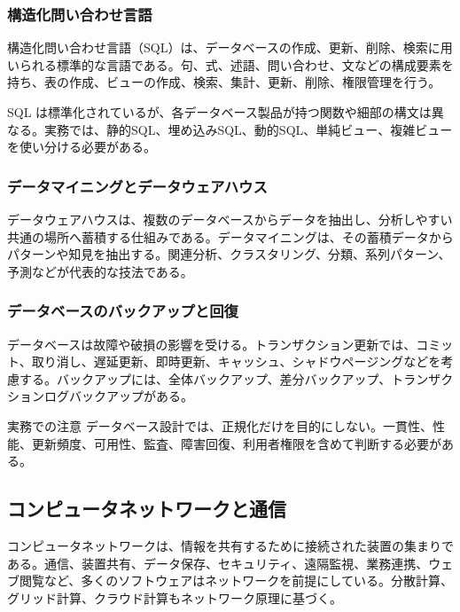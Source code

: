 \documentclass[a4paper,11pt]{ltjsarticle}
\numberwithin{figure}{section}
\numberwithin{table}{section}
\begin{document}
\subsubsection{構造化問い合わせ言語}

構造化問い合わせ言語（SQL）は、データベースの作成、更新、削除、検索に用いられる標準的な言語である。句、式、述語、問い合わせ、文などの構成要素を持ち、表の作成、ビューの作成、検索、集計、更新、削除、権限管理を行う。

SQL は標準化されているが、各データベース製品が持つ関数や細部の構文は異なる。実務では、静的SQL、埋め込みSQL、動的SQL、単純ビュー、複雑ビューを使い分ける必要がある。

\subsubsection{データマイニングとデータウェアハウス}

データウェアハウスは、複数のデータベースからデータを抽出し、分析しやすい共通の場所へ蓄積する仕組みである。データマイニングは、その蓄積データからパターンや知見を抽出する。関連分析、クラスタリング、分類、系列パターン、予測などが代表的な技法である。

\subsubsection{データベースのバックアップと回復}

データベースは故障や破損の影響を受ける。トランザクション更新では、コミット、取り消し、遅延更新、即時更新、キャッシュ、シャドウページングなどを考慮する。バックアップには、全体バックアップ、差分バックアップ、トランザクションログバックアップがある。

\begin{pointbox}{実務での注意}
データベース設計では、正規化だけを目的にしない。一貫性、性能、更新頻度、可用性、監査、障害回復、利用者権限を含めて判断する必要がある。

\end{pointbox}

\subsection{コンピュータネットワークと通信}

コンピュータネットワークは、情報を共有するために接続された装置の集まりである。通信、装置共有、データ保存、セキュリティ、遠隔監視、業務連携、ウェブ閲覧など、多くのソフトウェアはネットワークを前提にしている。分散計算、グリッド計算、クラウド計算もネットワーク原理に基づく。
\end{document}
